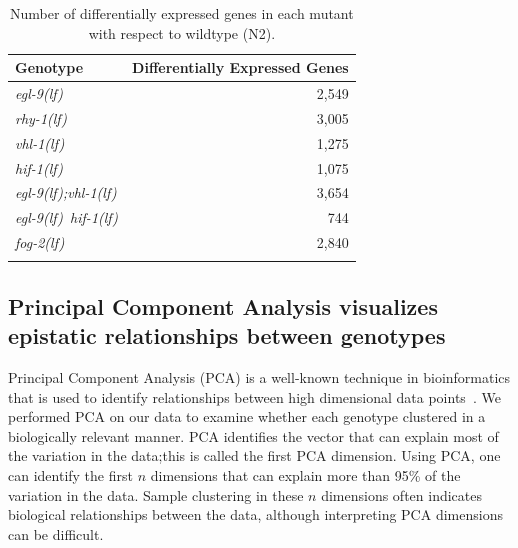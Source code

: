 \documentclass[10pt, onecolumn]{article}
\newcommand{\gene}[1]{\emph{#1}}
\newcommand{\fog}{\emph{\mbox{fog-2(lf)}}}
\newcommand{\egl}{\emph{\mbox{egl-9}(lf)}}
\newcommand{\rhy}{\emph{\mbox{rhy-1}(lf)}}
\newcommand{\vhl}{\emph{\mbox{vhl-1}(lf)}}
\newcommand{\eglvhl}{\emph{\mbox{egl-9(lf);vhl-1(lf)}}}
\newcommand{\eglhif}{\emph{\mbox{egl-9(lf)}~\mbox{hif-1(lf)}}}
\newcommand{\hif}{\emph{\mbox{hif-1(lf)}}}
\newcommand{\egln}{2,549}
\newcommand{\rhyn}{3,005}
\newcommand{\vhln}{1,275}
\newcommand{\eglvhln}{3,654}
\newcommand{\hifn}{1,075}
\newcommand{\eglhifn}{744}
\newcommand{\fogn}{2,840}
\begin{document}
\begin{table}[tbhp]
  \centering
  \begin{tabular}{lr}
    \toprule{}
    Genotype & Differentially Expressed Genes\\
    \midrule{}\egl{} & \egln{}\\
    \rhy{} & \rhyn{}\\
    \vhl{} & \vhln{}\\
    \hif{} & \hifn{}\\
    \eglvhl{} & \eglvhln{}\\
    \eglhif{} & \eglhifn{}\\
    \fog{} & \fogn{}\\
    \bottomrule{}
  \end{tabular}
  \caption{Number of differentially expressed genes in each mutant with respect
  to wildtype (N2).}
\label{tab:genes}
\end{table}

\subsection*{Principal Component Analysis visualizes epistatic relationships
             between genotypes}
\label{sub:Clustering}

Principal Component Analysis (PCA) is a well-known technique in bioinformatics
that is used to identify relationships between high dimensional data
points~\cite{Yeung2001}. We performed PCA on our data to examine whether each
genotype clustered in a biologically relevant manner. PCA identifies the vector
that can explain most of the variation in the data;this is called the first PCA
dimension. Using PCA, one can identify the first $n$ dimensions that can explain
more than 95\% of the variation in the data. Sample clustering in these $n$
dimensions often indicates biological relationships between the data, although
interpreting PCA dimensions can be difficult.

\end{document}
